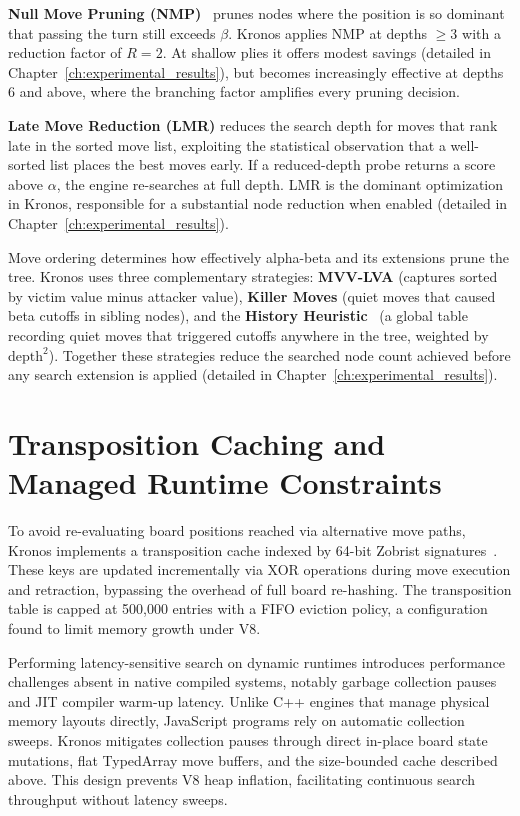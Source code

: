 \textbf{Null Move Pruning (NMP)}~\cite{donninger1993null} prunes nodes where the position is so dominant that passing the turn still exceeds $\beta$. Kronos applies NMP at depths $\geq 3$ with a reduction factor of $R = 2$. At shallow plies it offers modest savings (detailed in Chapter~\ref{ch:experimental_results}), but becomes increasingly effective at depths 6 and above, where the branching factor amplifies every pruning decision.

\textbf{Late Move Reduction (LMR)} reduces the search depth for moves that rank late in the sorted move list, exploiting the statistical observation that a well-sorted list places the best moves early. If a reduced-depth probe returns a score above $\alpha$, the engine re-searches at full depth. LMR is the dominant optimization in Kronos, responsible for a substantial node reduction when enabled (detailed in Chapter~\ref{ch:experimental_results}).



Move ordering determines how effectively alpha-beta and its extensions prune the tree. Kronos uses three complementary strategies: \textbf{MVV-LVA} (captures sorted by victim value minus attacker value), \textbf{Killer Moves} (quiet moves that caused beta cutoffs in sibling nodes), and the \textbf{History Heuristic}~\cite{schaeffer1989history} (a global table recording quiet moves that triggered cutoffs anywhere in the tree, weighted by $\text{depth}^2$). Together these strategies reduce the searched node count achieved before any search extension is applied (detailed in Chapter~\ref{ch:experimental_results}).




\section{Transposition Caching and Managed Runtime Constraints}
To avoid re-evaluating board positions reached via alternative move paths, Kronos implements a transposition cache indexed by 64-bit Zobrist signatures~\cite{zobrist1970new}. These keys are updated incrementally via XOR operations during move execution and retraction, bypassing the overhead of full board re-hashing. The transposition table is capped at 500,000 entries with a FIFO eviction policy, a configuration found to limit memory growth under V8.

Performing latency-sensitive search on dynamic runtimes introduces performance challenges absent in native compiled systems, notably garbage collection pauses and JIT compiler warm-up latency. Unlike C++ engines that manage physical memory layouts directly, JavaScript programs rely on automatic collection sweeps. Kronos mitigates collection pauses through direct in-place board state mutations, flat TypedArray move buffers, and the size-bounded cache described above. This design prevents V8 heap inflation, facilitating continuous search throughput without latency sweeps.

